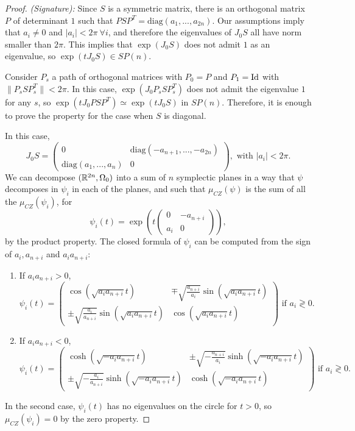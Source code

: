 \begin{proof} {\it (Signature):} Since $S$ is a symmetric matrix, there is an orthogonal matrix $P$ of determinant $1$ such that $PSP^T = \text{diag}(a_1,...,a_{2n})$. Our assumptions imply that $a_i \neq 0$ and $|a_i| < 2\pi \ \forall i$, and therefore the eigenvalues of $J_0 S$ all have norm smaller than $2\pi$. This implies that $\exp(J_0S)$ does not admit $1$ as an eigenvalue, so $\exp(tJ_0S) \in SP(n)$.

Consider $P_s$ a path of orthogonal matrices with $P_0=P$ and $P_1=\text{Id}$ with $\|P_sSP_s^T\| < 2\pi$. In this case, $\exp(J_0P_sSP_s^T)$ does not admit the eigenvalue $1$ for any $s$, so $\exp(tJ_0PSP^T) \simeq \exp(tJ_0S)$ in $SP(n)$. Therefore, it is enough to prove the property for the case when $S$ is diagonal.

In this case,
\[J_0S = \begin{pmatrix} 0 & \text{diag}(-a_{n+1},...,-a_{2n}) \\ \text{diag}(a_1,...,a_n) & 0 \end{pmatrix} , \text{ with } |a_i| < 2\pi .\]
We can decompose $(\mathbb{R}^{2n},\Omega_0)$ into a sum of $n$ symplectic planes in a way that $\psi$ decomposes in $\psi_i$ in each of the planes, and such that $\mu_{CZ}(\psi)$ is the sum of all the $\mu_{CZ}(\psi_i)$, for
\[\psi_i(t) = \exp\left(t\begin{pmatrix} 0 & -a_{n+i} \\ a_i & 0 \end{pmatrix}\right) ,\]
by the product property. The closed formula of $\psi_i$ can be computed from the sign of $a_i,a_{n+i}$ and $a_ia_{n+i}$:

\begin{enumerate}
	\item If $a_ia_{n+i} > 0$,
	\[\psi_i(t) = \begin{pmatrix} \cos(\sqrt{a_ia_{n+i}}t) & \mp \sqrt{\frac{a_{n+i}}{a_i}} \sin(\sqrt{a_ia_{n+i}}t) \\ \pm \sqrt{\frac{a_i}{a_{n+i}}} \sin(\sqrt{a_ia_{n+i}}t) & \cos(\sqrt{a_ia_{n+i}}t) \end{pmatrix} \text{ if } a_i \gtrless 0 .\]
	\item If $a_ia_{n+i} < 0$,
	\[\psi_i(t) = \begin{pmatrix} \cosh(\sqrt{-a_ia_{n+i}}t) & \pm \sqrt{-\frac{a_{n+i}}{a_i}} \sinh(\sqrt{-a_ia_{n+i}}t) \\ \pm \sqrt{-\frac{a_i}{a_{n+i}}} \sinh(\sqrt{-a_ia_{n+i}}t) & \cosh(\sqrt{-a_ia_{n+i}}t) \end{pmatrix} \text{ if } a_i \gtrless 0 .\]
\end{enumerate}
In the second case, $\psi_i(t)$ has no eigenvalues on the circle for $t>0$, so $\mu_{CZ}(\psi_i) = 0$ by the zero property.


\end{proof}
